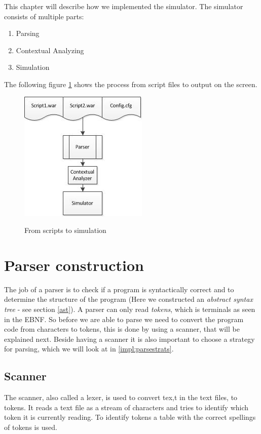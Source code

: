 This chapter will describe how we implemented the simulator. The simulator consists of multiple parts: \\
\begin{enumerate}
	\item Parsing
	\item Contextual Analyzing
	\item Simulation
\end{enumerate}

The following figure \ref{fig:scripttosimu} shows the process from script files to output on the screen.

\begin{figure}[H]
\centering
\includegraphics[scale=1.2]{rapport/6/figures/script_to_simu}
\label{fig:scripttosimu}
\caption{From scripts to simulation}
\end{figure}

\section{Parser construction}
	The job of a parser is to check if a program is syntactically correct and 
	to determine the structure of the program (Here we constructed an {\it abstract syntax tree} - see section \ref{ast}).
	A parser can only read {\it tokens}, which is terminals as seen in the EBNF. So before we are able to parse we need to convert 
	the program code from characters to tokens, this is done by using a scanner, that will be explained next. Beside having a scanner it is 
	also important to choose a strategy for parsing, which we will look at in \ref{impl:parsestrats}.
	
	\subsection{Scanner}
		The scanner, also called a lexer, is used to convert tex,t in the text files, to tokens. 
		It reads a text file as a stream of characters and tries to identify which token it is currently reading.
		To identify tokens a table with the correct spellings of tokens is used.			 
		
